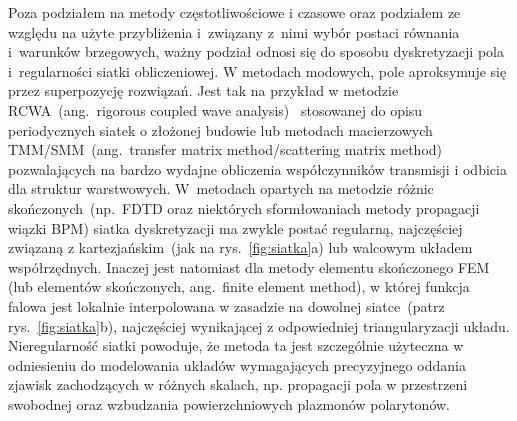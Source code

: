 Poza podziałem na metody częstotliwościowe i czasowe oraz podziałem ze względu na użyte przybliżenia i~związany z~nimi wybór postaci równania i~warunków brzegowych, ważny podział odnosi się do sposobu dyskretyzacji pola i~regularności siatki obliczeniowej. W metodach modowych, pole aproksymuje się przez superpozycję rozwiązań. Jest tak na przykład w metodzie RCWA~(ang.~rigorous coupled wave analysis)~\cite{hench2008rcwa} stosowanej do opisu periodycznych siatek o złożonej budowie lub metodach macierzowych TMM/SMM~(ang.~transfer matrix method/scattering matrix method)~\cite{teich1991fundamentalsTMM,yeh2006} pozwalających na bardzo wydajne obliczenia współczynników transmisji i odbicia dla struktur warstwowych. W~metodach opartych na metodzie różnic skończonych~(np.~FDTD oraz niektórych sformłowaniach metody propagacji wiązki BPM) siatka dyskretyzacji ma zwykle postać regularną, najczęściej związaną z kartezjańskim~(jak na rys.~\ref{fig:siatka}a) lub walcowym układem współrzędnych. Inaczej jest natomiast dla metody elementu skończonego FEM (lub elementów skończonych, ang.~finite element method), w której funkcja falowa jest lokalnie interpolowana w zasadzie na dowolnej siatce~(patrz rys.~\ref{fig:siatka}b), najczęściej wynikającej z odpowiedniej triangularyzacji układu. Nieregularność siatki powoduje, że metoda ta jest szczególnie użyteczna w odniesieniu do modelowania układów wymagających precyzyjnego oddania zjawisk zachodzących w różnych skalach, np. propagacji pola w przestrzeni swobodnej oraz wzbudzania powierzchniowych plazmonów polarytonów.


